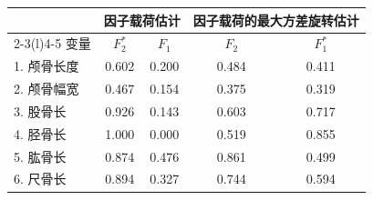 \begin{mvtable}
\small
\begin{tabular}{lcc|cc}
\toprule
& \multicolumn{2}{c}{因子载荷估计} & \multicolumn{2}{c}{因子载荷的最大方差旋转估计}\\
\cmidrule(r){2-3}\cmidrule(l){4-5}
变\quad 量 & $F_2^{*}$ & $F_1$ & $F_2$ & $F_1^{*}$\\
\midrule
1. 颅骨长度 & 0.602 & 0.200 & 0.484 & 0.411\\
2. 颅骨幅宽 & 0.467 & 0.154 & 0.375 & 0.319\\
3. 股骨长 & 0.926 & 0.143 & 0.603 & 0.717\\
4. 胫骨长 & 1.000 & 0.000 & 0.519 & 0.855\\
5. 肱骨长 & 0.874 & 0.476 & 0.861 & 0.499\\
6. 尺骨长 & 0.894 & 0.327 & 0.744 & 0.594\\
\bottomrule
\end{tabular}
\end{mvtable}

